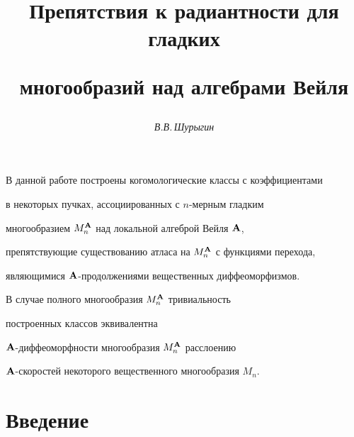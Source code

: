 






\author{\it В.В.\,Шурыгин}




\title{Препятствия  к радиантности для гладких 


многообразий над алгебрами Вейля}





\date{}




\pagestyle{plain} %







\maketitle


\label{begin}











В данной работе построены когомологические классы с коэффициентами


в некоторых пучках, ассоциированных с $n$-мерным гладким


многообразием $M^{\bold A}_n$ над локальной алгеброй Вейля ${\bold A}$,


препятствующие существованию атласа на $M^{\bold A}_n$ с функциями перехода,


являющимися ${\bold A}$-продолжениями вещественных диффеоморфизмов.


В случае полного многообразия $M^{\bold A}_n$ тривиальность


построенных классов эквивалентна


${\bold A}$-диффеоморфности многообразия $M^{\bold A}_n$  расслоению


${\bold A}$-скоростей  некоторого вещественного многообразия $M_n$.








\section{Введение}





